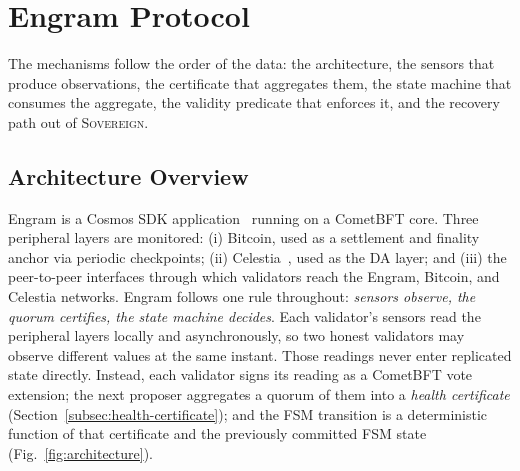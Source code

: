 \section{Engram Protocol}
\label{sec:protocol}

The mechanisms follow the order of the data: the architecture, the sensors that
produce observations, the certificate that aggregates them, the state machine
that consumes the aggregate, the validity predicate that enforces it, and the
recovery path out of \textsc{Sovereign}.

\subsection{Architecture Overview}
\label{subsec:architecture}

Engram is a Cosmos SDK application~\cite{kwon2016cosmos} running on a
CometBFT core. Three peripheral layers are monitored: (i) Bitcoin, used as a
settlement and finality anchor via periodic checkpoints; (ii)
Celestia~\cite{albassam2019lazyledger}, used as the DA layer; and (iii) the
peer-to-peer interfaces through which validators reach the Engram, Bitcoin,
and Celestia networks. Engram follows one rule throughout:
\emph{sensors observe, the quorum certifies, the state machine decides}.
Each validator's sensors read the peripheral layers
locally and asynchronously, so two honest validators may observe different
values at the same instant. Those readings never enter replicated state
directly. Instead, each validator signs its reading as a CometBFT vote
extension; the next proposer aggregates a quorum of them into a
\emph{health certificate} (Section~\ref{subsec:health-certificate}); and the
FSM transition is a deterministic function of that certificate and the
previously committed FSM state (Fig.~\ref{fig:architecture}).

